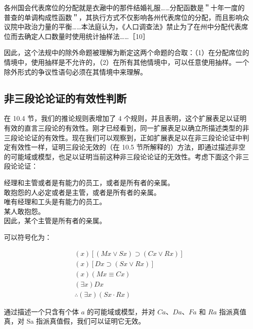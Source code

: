 各州国会代表席位的分配就是衣瀜中的那件结婚礼服……分配函数是＂十年一度的普查的单调构成性函数＂，其执行方式不仅影响各州代表席位的分配，而且影响众议院中政治力量的平衡……本法庭认为，《人口调查法》禁止为了在州中分配代表席位而去确定人口数量时使用统计抽样法……［10］

因此，这个法规中的除外命题被理解为断定这两个命题的合取：（1）在分配席位的情境中，使用抽样是不允许的，（2）在所有其他情境中，可以任意使用抽样。一个除外形式的争议性语句必须在其情境中来理解。

\subsection{非三段论论证的有效性判断}

在 10.4 节，我们的推论规则表增加了 4 个规则，并且表明，这个扩展表足以证明有效的直言三段论的有效性。刚才已经看到，同一扩展表足以确立所描述类型的非三段论论证的有效性。现在我们可以观察到，正如扩展表足以在非三段论论证中判定有效性一样，证明三段论无效的（在 10.5 节所解释的）方法，即通过描述非空的可能域或模型，也足以证明当前这种非三段论论证的无效性。考虑下面这个非三段论论证：

经理和主管或者是有能力的员工，或者是所有者的亲属。\\
敢抱怨的人必定或者是主管，或者是所有者的亲属。\\
唯有经理和工头是有能力的员工。\\
某人敢抱怨。\\
因此，某个主管是所有者的亲属。

可以符号化为：

$$
\begin{aligned}
& (x)[(M x \vee S x) \supset(C x \vee R x)] \\
& (x)[D x \supset(S x \vee R x)] \\
& (x)(M x \equiv C x) \\
& (\exists x) D x \\
& \therefore(\exists x)(S x \cdot R x)
\end{aligned}
$$

通过描述一个只含有个体 $a$ 的可能域或模型，并对 $C a 、 D a 、 F a$ 和 $R a$ 指派真值真，对 Sa 指派真值假，我们可以证明它无效。 

